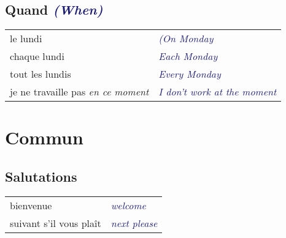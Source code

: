 \documentclass{microdoc} %
\newcommand\lEmph[1]{\textcolor{OliveGreen}{\emph{#1}}}
\newcommand\lEng[1]{\textcolor{MidnightBlue}{{\it #1}}}
\newcommand\lEngLit[1]{{\it[lit: \textcolor{NavyBlue}{#1}]}}
\begin{document}
\subsection{Quand \lEng{(When)}} %
\begin{table}[H]
    \begin{tabular}{l l}
        le lundi                                 & \lEng{(On Monday}\\
        chaque lundi                             & \lEng{Each Monday}\\
        tout les lundis                          & \lEng{Every Monday}\\
        je ne travaille pas \lEmph{en ce moment} & \lEng{I don't work at the moment}
    \end{tabular}
\end{table}






\section{Commun} %

\subsection{Salutations}
\begin{table}[H]
    \begin{tabular}{l l}
        bienvenue                              & \lEng{welcome}\\
        suivant s'il vous plaît                & \lEng{next please}\\
    \end{tabular}
\end{table}
\end{document}
